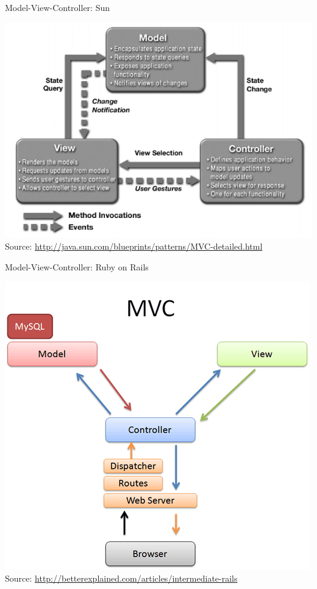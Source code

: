 \begin{frame}{Model-View-Controller: Sun}
  \begin{center}
    \includegraphics[scale=0.4]{figures/mvc} \\
    \tiny{Source: \url{http://java.sun.com/blueprints/patterns/MVC-detailed.html}}
  \end{center}
\end{frame}

\begin{frame}{Model-View-Controller: Ruby on Rails}
  \begin{center}
    \includegraphics[scale=0.4]{figures/mvc-rails} \\
    \tiny{Source: \url{http://betterexplained.com/articles/intermediate-rails}}
  \end{center}
\end{frame}

